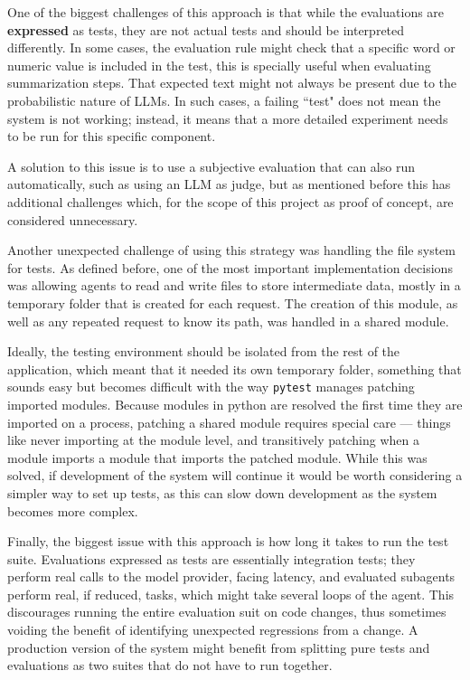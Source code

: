 \documentclass[a4paper]{report}
\begin{document}
One of the biggest challenges of this approach is that while the evaluations are \textbf{expressed} as tests, they are not actual tests and should be interpreted differently. In some cases, the evaluation rule might check that a specific word or numeric value is included in the test, this is specially useful when evaluating summarization steps. That expected text might not always be present due to the probabilistic nature of LLMs. In such cases, a failing ``test" does not mean the system is not working; instead, it means that a more detailed experiment needs to be run for this specific component.

A solution to this issue is to use a subjective evaluation that can also run automatically, such as using an LLM as judge, but as mentioned before this has additional challenges which, for the scope of this project as proof of concept, are considered unnecessary.

Another unexpected challenge of using this strategy was handling the file system for tests. As defined before, one of the most important implementation decisions was allowing agents to read and write files to store intermediate data, mostly in a temporary folder that is created for each request. The creation of this module, as well as any repeated request to know its path, was handled in a shared module.

Ideally, the testing environment should be isolated from the rest of the application, which meant that it needed its own temporary folder, something that sounds easy but becomes difficult with the way \texttt{pytest} manages patching imported modules. Because modules in python are resolved the first time they are imported on a process, patching a shared module requires special care --- things like never importing at the module level, and transitively patching when a module imports a module that imports the patched module. While this was solved, if development of the system will continue it would be worth considering a simpler way to set up tests, as this can slow down development as the system becomes more complex.

Finally, the biggest issue with this approach is how long it takes to run the test suite. Evaluations expressed as tests are essentially integration tests; they perform real calls to the model provider, facing latency, and evaluated subagents perform real, if reduced, tasks, which might take several loops of the agent. This discourages running the entire evaluation suit on code changes, thus sometimes voiding the benefit of identifying unexpected regressions from a change. A production version of the system might benefit from splitting pure tests and evaluations as two suites that do not have to run together.
\end{document}
